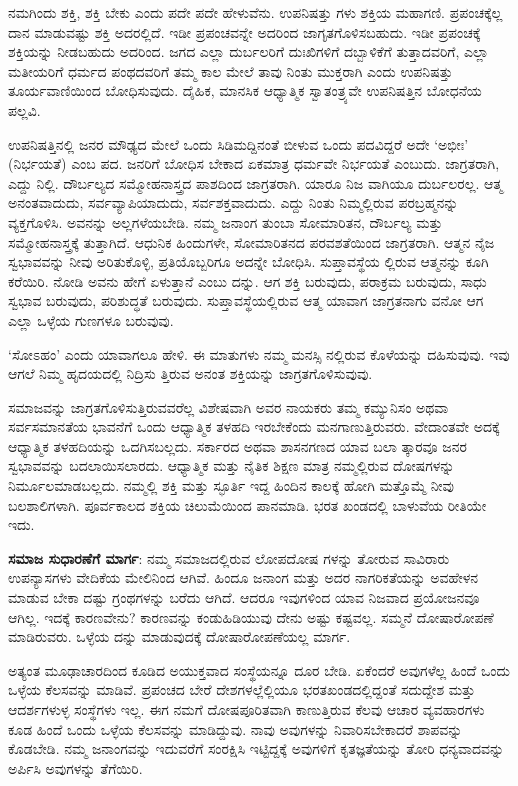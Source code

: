 ನಮಗಿಂದು ಶಕ್ತಿ, ಶಕ್ತಿ ಬೇಕು ಎಂದು ಪದೇ ಪದೇ ಹೇಳುವೆನು. ಉಪನಿಷತ್ತು ಗಳು ಶಕ್ತಿಯ ಮಹಾಗಣಿ. ಪ್ರಪಂಚಕ್ಕೆಲ್ಲ ದಾನ ಮಾಡುವಷ್ಟು ಶಕ್ತಿ ಅದರಲ್ಲಿದೆ. ಇಡೀ ಪ್ರಪಂಚವನ್ನೇ ಅದರಿಂದ ಜಾಗೃತಗೊಳಿಸಬಹುದು. ಇಡೀ ಪ್ರಪಂಚಕ್ಕೆ ಶಕ್ತಿಯನ್ನು ನೀಡಬಹುದು ಅದರಿಂದ. ಜಗದ ಎಲ್ಲಾ ದುರ್ಬಲರಿಗೆ ದುಃಖಿಗಳಿಗೆ ದಬ್ಬಾಳಿಕೆಗೆ ತುತ್ತಾದವರಿಗೆ, ಎಲ್ಲಾ ಮತೀಯರಿಗೆ ಧರ್ಮದ ಪಂಥದವರಿಗೆ ತಮ್ಮ ಕಾಲ ಮೇಲೆ ತಾವು ನಿಂತು ಮುಕ್ತರಾಗಿ ಎಂದು ಉಪನಿಷತ್ತು ತೂರ್ಯವಾಣಿಯಿಂದ ಬೋಧಿಸುವುದು. ದೈಹಿಕ, ಮಾನಸಿಕ ಆಧ್ಯಾತ್ಮಿಕ ಸ್ವಾತಂತ್ರ್ಯವೇ ಉಪನಿಷತ್ತಿನ ಬೋಧನೆಯ ಪಲ್ಲವಿ.

ಉಪನಿಷತ್ತಿನಲ್ಲಿ ಜನರ ಮೌಢ್ಯದ ಮೇಲೆ ಒಂದು ಸಿಡಿಮದ್ದಿನಂತೆ ಬೀಳುವ ಒಂದು ಪದವಿದ್ದರೆ ಅದೇ ‘ಅಭೀಃ’ (ನಿರ್ಭಯತೆ) ಎಂಬ ಪದ. ಜನರಿಗೆ ಬೋಧಿಸ ಬೇಕಾದ ಏಕಮಾತ್ರ ಧರ್ಮವೇ ನಿರ್ಭಯತೆ ಎಂಬುದು. ಜಾಗ್ರತರಾಗಿ, ಎದ್ದು ನಿಲ್ಲಿ. ದೌರ್ಬಲ್ಯದ ಸಮ್ಮೋಹನಾಸ್ತ್ರದ ಪಾಶದಿಂದ ಜಾಗ್ರತರಾಗಿ. ಯಾರೂ ನಿಜ ವಾಗಿಯೂ ದುರ್ಬಲರಲ್ಲ. ಆತ್ಮ ಅನಂತವಾದುದು, ಸರ್ವವ್ಯಾಪಿಯಾದುದು, ಸರ್ವಶಕ್ತವಾದುದು. ಎದ್ದು ನಿಂತು ನಿಮ್ಮಲ್ಲಿರುವ ಪರಬ್ರಹ್ಮನನ್ನು ವ್ಯಕ್ತಗೊಳಿಸಿ. ಅವನನ್ನು ಅಲ್ಲಗಳೆಯಬೇಡಿ. ನಮ್ಮ ಜನಾಂಗ ತುಂಬಾ ಸೋಮಾರಿತನ, ದೌರ್ಬಲ್ಯ ಮತ್ತು ಸಮ್ಮೋಹನಾಸ್ತ್ರಕ್ಕೆ ತುತ್ತಾಗಿದೆ. ಆಧುನಿಕ ಹಿಂದುಗಳೇ, ಸೋಮಾರಿತನದ ಪರವಶತೆಯಿಂದ ಜಾಗ್ರತರಾಗಿ. ಆತ್ಮನ ನೈಜ ಸ್ವಭಾವವನ್ನು ನೀವು ಅರಿತುಕೊಳ್ಳಿ, ಪ್ರತಿಯೊಬ್ಬರಿಗೂ ಅದನ್ನೇ ಬೋಧಿಸಿ. ಸುಪ್ತಾವಸ್ಥೆಯ ಲ್ಲಿರುವ ಆತ್ಮನನ್ನು ಕೂಗಿ ಕರೆಯಿರಿ. ನೋಡಿ ಅವನು ಹೇಗೆ ಏಳುತ್ತಾನೆ ಎಂಬು ದನ್ನು. ಆಗ ಶಕ್ತಿ ಬರುವುದು, ಪರಾಕ್ರಮ ಬರುವುದು, ಸಾಧು ಸ್ವಭಾವ ಬರುವುದು, ಪರಿಶುದ್ಧತೆ ಬರುವುದು. ಸುಪ್ತಾವಸ್ಥೆಯಲ್ಲಿರುವ ಆತ್ಮ ಯಾವಾಗ ಜಾಗ್ರತನಾಗು ವನೋ ಆಗ ಎಲ್ಲಾ ಒಳ್ಳೆಯ ಗುಣಗಳೂ ಬರುವುವು.

‘ಸೋಽಹಂ’ ಎಂದು ಯಾವಾಗಲೂ ಹೇಳಿ. ಈ ಮಾತುಗಳು ನಮ್ಮ ಮನಸ್ಸಿ ನಲ್ಲಿರುವ ಕೊಳೆಯನ್ನು ದಹಿಸುವುವು. ಇವು ಆಗಲೆ ನಿಮ್ಮ ಹೃದಯದಲ್ಲಿ ನಿದ್ರಿಸು ತ್ತಿರುವ ಅನಂತ ಶಕ್ತಿಯನ್ನು ಜಾಗ್ರತಗೊಳಿಸುವುವು.

ಸಮಾಜವನ್ನು ಜಾಗ್ರತಗೊಳಿಸುತ್ತಿರುವವರೆಲ್ಲ ವಿಶೇಷವಾಗಿ ಅವರ ನಾಯಕರು ತಮ್ಮ ಕಮ್ಯುನಿಸಂ ಅಥವಾ ಸರ್ವಸಮಾನತೆಯ ಭಾವನೆಗೆ ಒಂದು ಆಧ್ಯಾತ್ಮಿಕ ತಳಹದಿ ಇರಬೇಕೆಂದು ಮನಗಾಣುತ್ತಿರುವರು. ವೇದಾಂತವೇ ಅದಕ್ಕೆ ಆಧ್ಯಾತ್ಮಿಕ ತಳಹದಿಯನ್ನು ಒದಗಿಸಬಲ್ಲದು. ಸರ್ಕಾರದ ಅಥವಾ ಶಾಸನಗಣದ ಯಾವ ಬಲಾ ತ್ಕಾರವೂ ಜನರ ಸ್ವಭಾವವನ್ನು ಬದಲಾಯಿಸಲಾರದು. ಆಧ್ಯಾತ್ಮಿಕ ಮತ್ತು ನೈತಿಕ ಶಿಕ್ಷಣ ಮಾತ್ರ ನಮ್ಮಲ್ಲಿರುವ ದೋಷಗಳನ್ನು ನಿರ್ಮೂಲಮಾಡಬಲ್ಲದು. ನಮ್ಮಲ್ಲಿ ಶಕ್ತಿ ಮತ್ತು ಸ್ಫೂರ್ತಿ ಇದ್ದ ಹಿಂದಿನ ಕಾಲಕ್ಕೆ ಹೋಗಿ ಮತ್ತೊಮ್ಮೆ ನೀವು ಬಲಶಾಲಿಗಳಾಗಿ. ಪೂರ್ವಕಾಲದ ಶಕ್ತಿಯ ಚಿಲುಮೆಯಿಂದ ಪಾನಮಾಡಿ. ಭರತ ಖಂಡದಲ್ಲಿ ಬಾಳುವೆಯ ರೀತಿಯೇ ಇದು.

\textbf{ಸಮಾಜ ಸುಧಾರಣೆಗೆ ಮಾರ್ಗ}: ನಮ್ಮ ಸಮಾಜದಲ್ಲಿರುವ ಲೋಪದೋಷ ಗಳನ್ನು ತೋರುವ ಸಾವಿರಾರು ಉಪನ್ಯಾಸಗಳು ವೇದಿಕೆಯ ಮೇಲಿನಿಂದ ಆಗಿವೆ. ಹಿಂದೂ ಜನಾಂಗ ಮತ್ತು ಅದರ ನಾಗರಿಕತೆಯನ್ನು ಅವಹೇಳನ ಮಾಡುವ ಬೇಕಾ ದಷ್ಟು ಗ್ರಂಥಗಳನ್ನು ಬರೆದು ಆಗಿದೆ. ಆದರೂ ಇವುಗಳಿಂದ ಯಾವ ನಿಜವಾದ ಪ್ರಯೋಜನವೂ ಆಗಿಲ್ಲ. ಇದಕ್ಕೆ ಕಾರಣವೇನು? ಕಾರಣವನ್ನು ಕಂಡುಹಿಡಿಯುವು ದೇನು ಅಷ್ಟು ಕಷ್ಟವಲ್ಲ. ಸಮ್ಮನೆ ದೋಷಾರೋಪಣೆ ಮಾಡಿರುವರು. ಒಳ್ಳೆಯ ದನ್ನು ಮಾಡುವುದಕ್ಕೆ ದೋಷಾರೋಪಣೆಯಲ್ಲ ಮಾರ್ಗ.

ಅತ್ಯಂತ ಮೂಢಾಚಾರದಿಂದ ಕೂಡಿದ ಅಯುಕ್ತವಾದ ಸಂಸ್ಥೆಯನ್ನೂ ದೂರ ಬೇಡಿ. ಏಕೆಂದರೆ ಅವುಗಳೆಲ್ಲ ಹಿಂದೆ ಒಂದು ಒಳ್ಳೆಯ ಕೆಲಸವನ್ನು ಮಾಡಿವೆ. ಪ್ರಪಂಚದ ಬೇರೆ ದೇಶಗಳಲ್ಲೆಲ್ಲಿಯೂ ಭರತಖಂಡದಲ್ಲಿದ್ದಂತೆ ಸದುದ್ದೇಶ ಮತ್ತು ಆದರ್ಶಗಳುಳ್ಳ ಸಂಸ್ಥೆಗಳು ಇಲ್ಲ. ಈಗ ನಮಗೆ ದೋಷಪೂರಿತವಾಗಿ ಕಾಣುತ್ತಿರುವ ಕೆಲವು ಆಚಾರ ವ್ಯವಹಾರಗಳು ಕೂಡ ಹಿಂದೆ ಒಂದು ಒಳ್ಳೆಯ ಕೆಲಸವನ್ನು ಮಾಡಿದ್ದುವು. ನಾವು ಅವುಗಳನ್ನು ನಿವಾರಿಸಬೇಕಾದರೆ ಶಾಪವನ್ನು ಕೊಡಬೇಡಿ. ನಮ್ಮ ಜನಾಂಗವನ್ನು ಇದುವರೆಗೆ ಸಂರಕ್ಷಿಸಿ ಇಟ್ಟಿದ್ದಕ್ಕೆ ಅವುಗಳಿಗೆ ಕೃತಜ್ಞತೆಯನ್ನು ತೋರಿ ಧನ್ಯವಾದವನ್ನು ಅರ್ಪಿಸಿ ಅವುಗಳನ್ನು ತೆಗೆಯಿರಿ.

